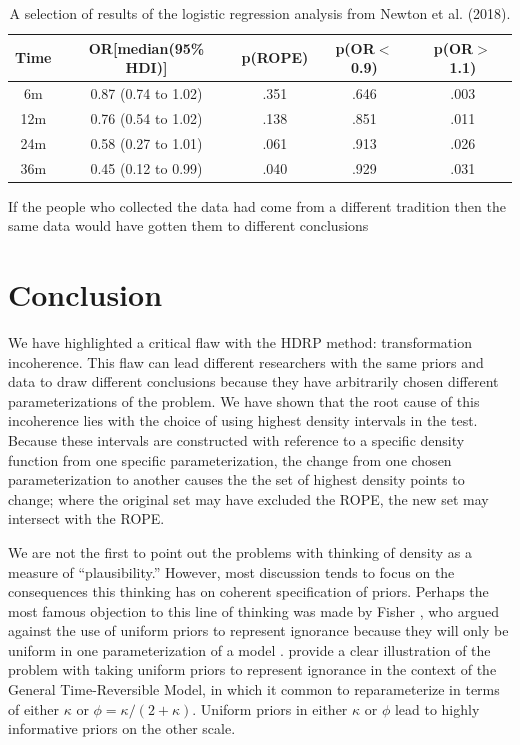 \documentclass[man]{apa}
\newcommand{\hdr}{HDRP}
\begin{document}
\begin{table}
\caption{A selection of results of the logistic regression analysis from Newton et al. (2018).}\label{tab:newton}
\begin{tabular}{ccccc}\hline
    Time & OR[median(95\% HDI)] & p(ROPE) & p(OR$<$0.9) & p(OR$>$1.1)  \\\hline
   6m  & 0.87 (0.74 to 1.02) & .351 & .646 & .003\\
   12m & 0.76 (0.54 to 1.02) & .138 & .851 & .011\\
   24m & 0.58 (0.27 to 1.01) & .061 & .913 & .026\\
   36m & 0.45 (0.12 to 0.99) & .040 & .929 & .031\\\hline
\end{tabular}
\end{table}

If the people who collected the data had come from a different tradition then the same data would have gotten them to different conclusions


\section*{Conclusion}
We have highlighted a critical flaw with the \hdr{} method: transformation incoherence. This flaw can lead different researchers with the same priors and data to draw different conclusions because they have arbitrarily chosen different parameterizations of the problem. We have shown that the root cause of this incoherence lies with the choice of using highest density intervals in the test. Because these intervals are constructed with reference to a specific density function from one specific parameterization, the change from one chosen parameterization to another causes the the set of highest density points to change; where the original set may have excluded the ROPE, the new set may intersect with the ROPE. 

We are not the first to point out the problems with thinking of density as a measure of ``plausibility.'' However, most discussion tends to focus on the consequences this thinking has on coherent specification of priors. Perhaps the most famous objection to this line of thinking was made by Fisher \cite{lehmann2011fisher}, who argued against the use of uniform priors to represent ignorance because they will only be uniform in one parameterization of a model \cite<for a thorough demonstration see>{ly2017tutorial}.  provide a clear illustration of the problem with taking uniform priors to represent ignorance in the context of the General Time-Reversible Model, in which it common to reparameterize in terms of either $\kappa$ or $\phi = \kappa/(2+\kappa)$. Uniform priors in either $\kappa$ or $\phi$ lead to highly informative priors on the other scale. 
\end{document}
